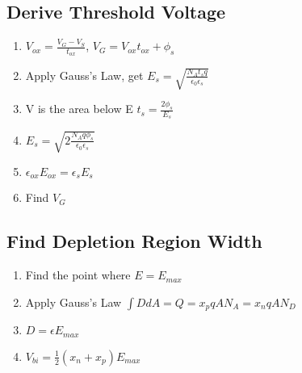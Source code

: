 \documentclass{article}
\begin{document}
   \subsection{Derive Threshold Voltage}
   \begin{enumerate}
     \item $V_{ox} = \frac{V_G - V_{S}}{t_{ox}}$, $V_G = V_{ox}t_{ox} + \phi_s$
     \item Apply Gauss's Law, get $E_s =\sqrt{ \frac{N_At_sq}{\epsilon_0\epsilon_s}}$ 
     \item V is the area below E $t_s = \frac{2\phi_s}{E_s}$
     \item $E_s =\sqrt{ 2\frac{N_Aq\phi_s}{\epsilon_0\epsilon_s}}$ 
     \item $\epsilon_{ox}E_{ox} = \epsilon_{s}E_s$
     \item Find $V_G$
   \end{enumerate}
   
   \subsection{Find Depletion Region Width}
   \begin{enumerate}
     \item Find the point where $E = E_{max}$
     \item Apply Gauss's Law $\int DdA = Q = x_pqAN_A = x_nqAN_D$
     \item $D = \epsilon E_{max}$
     \item $V_{bi} = \frac{1}{2}(x_n + x_p)E_{max}$
   \end{enumerate}
   
   
   
\end{document}
